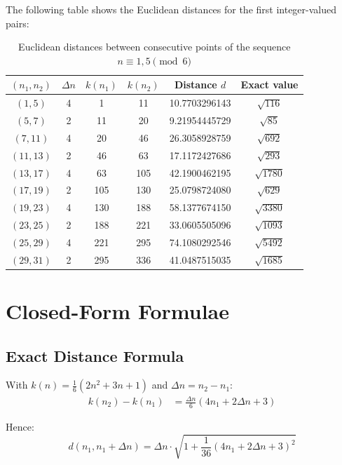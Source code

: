 \begin{example}
The following table shows the Euclidean distances for the first
integer-valued pairs:

\begin{table}[H]
	\centering
	\caption{Euclidean distances between consecutive points of
		the sequence $n \equiv 1,5 \pmod{6}$}
	\begin{tabular}{cccccc}
		\toprule
		$(n_1, n_2)$ & $\Delta n$ & $k(n_1)$ & $k(n_2)$ & Distance $d$ & Exact value \\
		\midrule
		$( 1,  5)$ & 4 &   1 &  11 &  10.7703296143 & $\sqrt{116}$  \\
		$( 5,  7)$ & 2 &  11 &  20 &   9.21954445729 & $\sqrt{85}$   \\
		$( 7, 11)$ & 4 &  20 &  46 &  26.3058928759 & $\sqrt{692}$  \\
		$(11, 13)$ & 2 &  46 &  63 &  17.1172427686 & $\sqrt{293}$  \\
		$(13, 17)$ & 4 &  63 & 105 &  42.1900462195 & $\sqrt{1780}$ \\
		$(17, 19)$ & 2 & 105 & 130 &  25.0798724080 & $\sqrt{629}$  \\
		$(19, 23)$ & 4 & 130 & 188 &  58.1377674150 & $\sqrt{3380}$ \\
		$(23, 25)$ & 2 & 188 & 221 &  33.0605505096 & $\sqrt{1093}$ \\  %
		$(25, 29)$ & 4 & 221 & 295 &  74.1080292546 & $\sqrt{5492}$ \\
		$(29, 31)$ & 2 & 295 & 336 &  41.0487515035 & $\sqrt{1685}$ \\
		\bottomrule
	\end{tabular}
\end{table}
\end{example}

\section{Closed-Form Formulae}

\subsection{Exact Distance Formula}

\begin{proposition}
With $k(n) = \frac{1}{6}(2n^2 + 3n + 1)$ and $\Delta n = n_2 - n_1$:
\begin{align}
k(n_2) - k(n_1) &= \frac{\Delta n}{6}(4n_1 + 2\Delta n + 3)
\end{align}

Hence:
\begin{equation}
d(n_1, n_1 + \Delta n) = \Delta n \cdot \sqrt{1 + \frac{1}{36}(4n_1 + 2\Delta n + 3)^2}
\end{equation}
\end{proposition}

